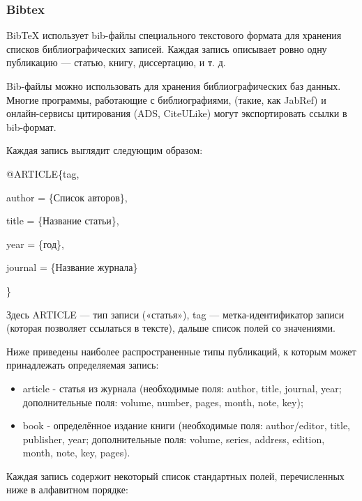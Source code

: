 \subsubsection*{Bibtex}

BibTeX использует bib-файлы специального текстового формата для хранения списков библиографических записей. Каждая запись описывает ровно одну публикацию — статью, книгу, диссертацию, и т. д.

Bib-файлы можно использовать для хранения библиографических баз данных. Многие программы, работающие с библиографиями, (такие, как JabRef) и онлайн-сервисы цитирования (ADS, CiteULike) могут экспортировать ссылки в bib-формат.

Каждая запись выглядит следующим образом:

@ARTICLE\{tag, \par
	author = \{Список авторов\}, \par
	title = \{Название статьи\}, \par
	year = \{год\}, \par
	journal = \{Название журнала\} \par
\} \par

Здесь ARTICLE — тип записи («статья»), tag — метка-идентификатор записи (которая позволяет ссылаться в тексте), дальше список полей со значениями.

Ниже приведены наиболее распространенные типы публикаций, к которым может принадлежать определяемая запись:

\begin{itemize}
\item article - статья из журнала (необходимые поля: author, title, journal, year; дополнительные поля: volume, number, pages, month, note, key);
\item book - определённое издание книги (необходимые поля: author/editor, title, publisher, year; дополнительные поля: volume, series, address, edition, month, note, key, pages).
\end{itemize}

Каждая запись содержит некоторый список стандартных полей, перечисленных ниже в алфавитном порядке:

